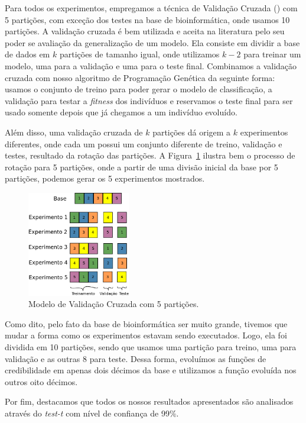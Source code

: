 Para todos os experimentos, empregamos a técnica de Validação Cruzada (\cite{Refaeilzadeh00}) com 5 partições, com exceção dos testes na base de bioinformática, onde usamos 10 partições.
A validação cruzada é bem utilizada e aceita na literatura pelo seu poder se avaliação da generalização de um modelo. Ela consiste em dividir a base de dados em $k$ partições de tamanho igual, onde utilizamos $k-2$ para treinar um modelo, uma para a validação e uma para o teste final.
Combinamos a validação cruzada com nosso algoritmo de Programação Genética da seguinte forma: usamos o conjunto de treino para poder gerar o modelo de classificação, a validação para testar a \textit{fitness} dos indivíduos e reservamos o teste final para ser usado somente depois que já chegamos a um indivíduo evoluído.

Além disso, uma validação cruzada de $k$ partições dá origem a $k$ experimentos diferentes, onde cada um possui um conjunto diferente de treino, validação e testes, resultado da rotação das partições. A Figura~\ref{fig::cv} ilustra bem o processo de rotação para 5 partições, onde a partir de uma divisão inicial da base por 5 partições, podemos gerar os 5 experimentos mostrados.

\begin{figure}[h!]
  \centering
  \includegraphics[width=0.40\textwidth]{figures/cv.png}
 \caption{Modelo de Validação Cruzada com 5 partições.}
\label{fig::cv}
\end{figure}

Como dito, pelo fato da base de bioinformática ser muito grande, tivemos que mudar a forma como os experimentos estavam sendo executados. Logo, ela foi dividida em 10 partições, sendo que usamos uma partição para treino, uma para validação e as outras 8 para teste. Dessa forma, evoluímos as funções de credibilidade em apenas dois décimos da base e utilizamos a função evoluída nos outros oito décimos.

Por fim, destacamos que todos os nossos resultados apresentados são analisados através do \textit{test-t} com nível de confiança de 99\%.

